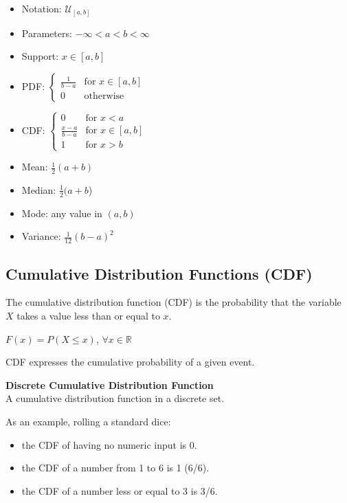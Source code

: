 \documentclass{article}
\begin{document}
\begin{itemize}
    \item Notation: $\displaystyle {\mathcal {U}}_{[a,b]}$
    \item Parameters: $\displaystyle -\infty <a<b<\infty$
    \item Support: $\displaystyle x\in [a,b]$
    \item PDF: $\displaystyle {\begin{cases}{\frac {1}{b-a}}&{\text{for }}x\in [a,b]\\0&{\text{otherwise}}\end{cases}}$
    \item CDF: $\displaystyle {\begin{cases}0&{\text{for }}x<a\\{\frac {x-a}{b-a}}&{\text{for }}x\in [a,b]\\1&{\text{for }}x>b\end{cases}}$
    \item Mean: $\displaystyle {\tfrac {1}{2}}(a+b)$
    \item Median:	$\displaystyle {\tfrac {1}{2}}(a+b$)
    \item Mode:	any value in $\displaystyle (a,b)$
    \item Variance:	$\displaystyle {\tfrac {1}{12}}(b-a)^{2}$
\end{itemize}

\subsection{Cumulative Distribution Functions (CDF)}
The cumulative distribution function (CDF) is the probability that the variable $X$ takes a value less than or equal to $x$. 

$F(x) = P(X \leq x)$, $\forall x \in \mathbb{R}$  

CDF expresses the cumulative probability of a given event.

\textbf{Discrete Cumulative Distribution Function} \\
A cumulative distribution function in a discrete set.

As an example, rolling a standard dice:
\begin{itemize}
    \item the CDF of having no numeric input is 0.
    \item the CDF of a number from 1 to 6 is 1 (6/6).
    \item the CDF of a number less or equal to 3 is 3/6.
\end{itemize}
\end{document}

